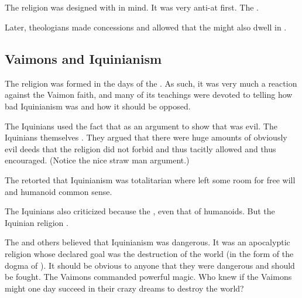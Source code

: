 \subsection{\Humans}
The \rethyax religion was designed with \scathae in mind.
It was very anti-\human at first. 
The . 

Later, theologians made concessions and allowed that the \Primordials might also dwell in \humans.









\subsection{Vaimons and Iquinianism}
The \Ortaican religion was formed in the days of the \VaimonCaliphate. 
As such, it was very much a reaction against the Vaimon faith, and many of its teachings were devoted to telling how bad Iquinianism was and how it should be opposed.

The Iquinians used the fact that  as an argument to show that \Ortaicanism was evil.
The Iquinians themselves .
They argued that there were huge amounts of obviously evil deeds that the religion did not forbid and thus tacitly allowed and thus encouraged.
(Notice the nice straw man argument.)

The \Ortaicans retorted that Iquinianism was totalitarian where \Ortaicanism left some room for free will and humanoid common sense. 

The Iquinians also criticized \Ortaica because the \Ortaicans {}, even that of humanoids.
But the Iquinian religion . 

The \rethyaxes and others believed that Iquinianism was dangerous.
It was an apocalyptic religion whose declared goal was the destruction of the world (in the form of the dogma of ).
It should be obvious to anyone that they were dangerous and should be fought.
The Vaimons commanded powerful magic. 
Who knew if the Vaimons might one day succeed in their crazy dreams to destroy the world?

